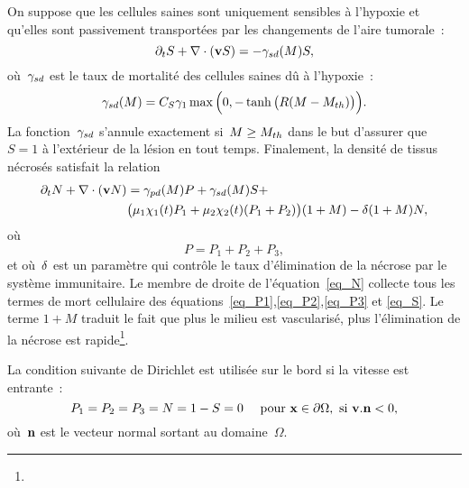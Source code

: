 \documentclass[main.tex]{subfiles}
\begin{document}
On suppose que les cellules saines sont uniquement sensibles à l'hypoxie et qu'elles sont passivement transportées par les changements de l'aire tumorale~:
\begin{equation}
\partial_t S + \nabla\cdot(\mathbf{v} S) =  -\gamma_{sd}(M) S, \label{eq_S}
\end{equation}
où~$\gamma_{sd}$ est le taux de mortalité des cellules saines dû à l'hypoxie~:
\begin{equation}
\gamma_{sd}(M)=C_S \gamma_1  \max\Big(0,-\tanh\big(R(M-M_{th})\big)\Big). \label{eq_gammasd}
\end{equation}
La fonction~$\gamma_{sd}$  s'annule exactement si~$M\geq M_{th}$ dans le but d'assurer que~$S=1$ à l'extérieur de la lésion en tout temps. Finalement, la densité de tissus nécrosés satisfait la relation 
\begin{equation}\label{eq_N}
\begin{aligned}
\partial_t N + \nabla\cdot(\mathbf{v} N) & =  \gamma_{pd}(M) P +\gamma_{sd}(M) S  + \\ & \big(\mu_1 \chi_1(t)P_1 + \mu_2\chi_2(t)(P_1+P_2)\big)(1+M) - \delta(1+M)N,
\end{aligned}\end{equation}
où
\begin{equation}
P = P_1+P_2+P_3,
\end{equation}
et où~$\delta$ est un paramètre qui contrôle le taux d'élimination de la nécrose par le système immunitaire. 
Le membre de droite de l'équation~\eqref{eq_N} collecte tous les termes de mort cellulaire des équations~\eqref{eq_P1},\eqref{eq_P2},\eqref{eq_P3} et \eqref{eq_S}. 
Le terme $1+M$ traduit le fait que plus le milieu est vascularisé, plus l'élimination de la nécrose est rapide\footnote{}.


La condition suivante de Dirichlet est utilisée sur le bord si la vitesse est entrante~:
\begin{equation}\label{eq_CL_pop}
P_1=P_2=P_3=N=1-S=0  \quad \textrm{ pour } \mathbf{x} \in \partial \Omega, \textrm{ si } \mathbf{v}.{\bf n}<0,
\end{equation}
où~${\bf n}$ est le vecteur normal sortant au domaine~$\Omega$.
\end{document}
